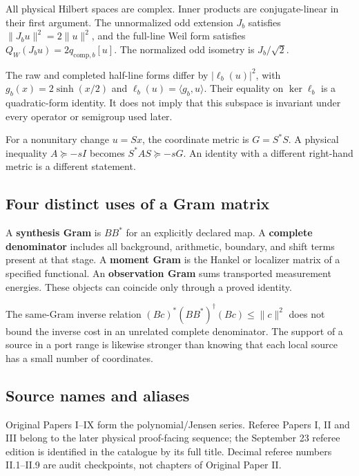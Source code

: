 \documentclass[
  10pt,
  a4paper,
  10pt,
  oneside,
  openany]{book}
\begin{document}
All physical Hilbert spaces are complex. Inner products are
conjugate-linear in their first argument. The unnormalized odd extension
\(J_b\) satisfies \(\|J_bu\|^2=2\|u\|^2\), and the full-line Weil form
satisfies \(Q_W(J_bu)=2q_{\mathrm{comp},b}[u]\). The normalized odd
isometry is \(J_b/\sqrt2\).

The raw and completed half-line forms differ by \(|\ell_b(u)|^2\), with
\(g_b(x)=2\sinh(x/2)\) and \(\ell_b(u)=\langle g_b,u\rangle\). Their
equality on \(\ker\ell_b\) is a quadratic-form identity. It does not
imply that this subspace is invariant under every operator or semigroup
used later.

For a nonunitary change \(u=Sx\), the coordinate metric is \(G=S^*S\). A
physical inequality \(A\succeq-sI\) becomes \(S^*AS\succeq-sG\). An
identity with a different right-hand metric is a different statement.

\subsection{Four distinct uses of a Gram
matrix}\label{four-distinct-uses-of-a-gram-matrix}

A \textbf{synthesis Gram} is \(BB^*\) for an explicitly declared map. A
\textbf{complete denominator} includes all background, arithmetic,
boundary, and shift terms present at that stage. A \textbf{moment Gram}
is the Hankel or localizer matrix of a specified functional. An
\textbf{observation Gram} sums transported measurement energies. These
objects can coincide only through a proved identity.

The same-Gram inverse relation \((Bc)^*(BB^*)^\dagger(Bc)\le\|c\|^2\)
does not bound the inverse cost in an unrelated complete denominator.
The support of a source in a port range is likewise stronger than
knowing that each local source has a small number of coordinates.

\subsection{Source names and aliases}\label{source-names-and-aliases}

Original Papers I--IX form the polynomial/Jensen series. Referee Papers
I, II and III belong to the later physical proof-facing sequence; the
September 23 referee edition is identified in the catalogue by its full
title. Decimal referee numbers II.1--II.9 are audit checkpoints, not
chapters of Original Paper II.
\end{document}
